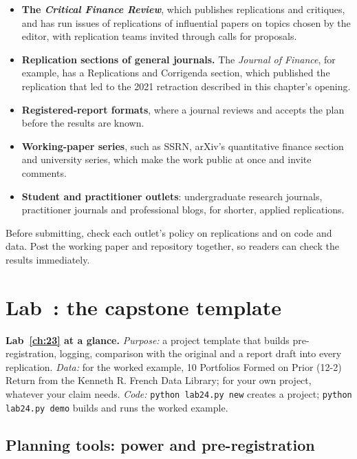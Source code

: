 \begin{itemize}
  \item \textbf{The \emph{Critical Finance Review}}, which publishes replications and critiques, and has run issues of replications of influential papers on topics chosen by the editor, with replication teams invited through calls for proposals.
  \item \textbf{Replication sections of general journals.} The \emph{Journal of Finance}, for example, has a Replications and Corrigenda section, which published the replication that led to the 2021 retraction described in this chapter's opening.
  \item \textbf{Registered-report formats}, where a journal reviews and accepts the plan before the results are known.
  \item \textbf{Working-paper series}, such as SSRN, arXiv's quantitative finance section and university series, which make the work public at once and invite comments.
  \item \textbf{Student and practitioner outlets}: undergraduate research journals, practitioner journals and professional blogs, for shorter, applied replications.
\end{itemize}

Before submitting, check each outlet's policy on replications and on code and data. Post the working paper and repository together, so readers can check the results immediately.

\section{Lab~\thechapter: the capstone template}
\label{sec:24-lab}

\begin{callout}
\textbf{Lab~\ref{ch:23} at a glance.} \emph{Purpose:} a project template that builds pre-registration, logging, comparison with the original and a report draft into every replication. \emph{Data:} for the worked example, 10 Portfolios Formed on Prior (12-2) Return from the Kenneth R. French Data Library; for your own project, whatever your claim needs. \emph{Code:} \texttt{python lab24.py new} creates a project; \texttt{python lab24.py demo} builds and runs the worked example.
\end{callout}

\subsection*{Planning tools: power and pre-registration}
\label{sec:24-planning-lab}

